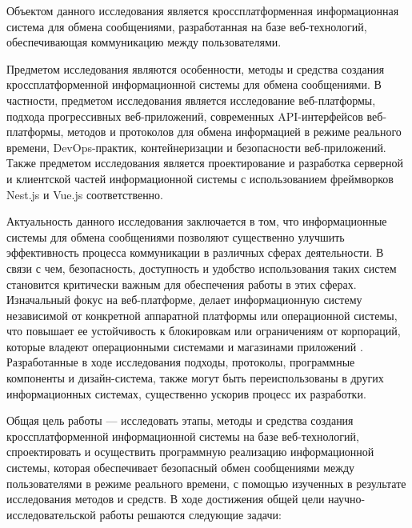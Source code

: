 Объектом данного исследования является кроссплатформенная информационная система для обмена сообщениями, разработанная на базе веб-технологий, обеспечивающая коммуникацию между пользователями.

Предметом исследования являются особенности, методы и средства создания кроссплатформенной информационной системы для обмена сообщениями. В частности, предметом исследования является исследование веб-платформы, подхода прогрессивных веб-приложений, современных API-интерфейсов веб-платформы, методов и протоколов для обмена информацией в режиме реального времени, DevOps-практик, контейнеризации и безопасности веб-приложений. Также предметом исследования является проектирование и разработка серверной и клиентской частей информационной системы с использованием фреймворков Nest.js и Vue.js соответственно.

Актуальность данного исследования заключается в том, что информационные системы для обмена сообщениями позволяют существенно улучшить эффективность процесса коммуникации в различных сферах деятельности. В связи с чем, безопасность, доступность и удобство использования таких систем становится критически важным для обеспечения работы в этих сферах. Изначальный фокус на веб-платформе, делает информационную систему независимой от конкретной аппаратной платформы или операционной системы, что повышает ее устойчивость к блокировкам или ограничениям от корпораций, которые владеют операционными системами и магазинами приложений \cite{webofthings2}. Разработанные в ходе исследования подходы, протоколы, программные компоненты и дизайн-система, также могут быть переиспользованы в других информационных системах, существенно ускорив процесс их разработки.

Общая цель работы — исследовать этапы, методы и средства создания кроссплатформенной информационной системы на базе веб-технологий, спроектировать и осуществить программную реализацию информационной системы, которая обеспечивает безопасный обмен сообщениями между пользователями в режиме реального времени, с помощью изученных в результате исследования методов и средств. В ходе достижения общей цели научно-исследовательской работы решаются следующие задачи:

